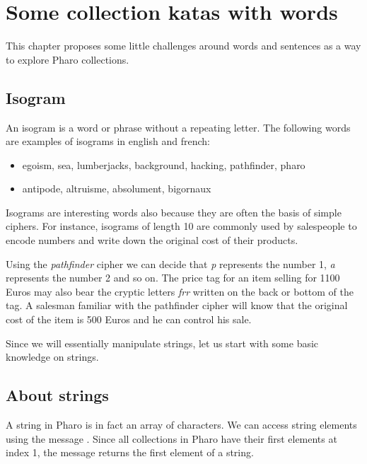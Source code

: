 \documentclass[10pt,twoside,english]{_support/latex/sbabook/sbabook}
\begin{document}
\frontmatter
\pagestyle{plain}

\tableofcontents*
\clearpage\listoffigures

\mainmatter

\chapter{Some collection katas with words}\label{cha:katas}
This chapter proposes some little challenges around words and sentences as a way to explore Pharo collections.
\section{Isogram}
An isogram is a word or phrase without a repeating letter. The following words are examples of isograms in english and french:

\begin{itemize}
\item egoism, sea, lumberjacks, background, hacking, pathfinder, pharo
\item antipode, altruisme, absolument, bigornaux
\end{itemize}

Isograms are interesting words also because they are often the basis of simple ciphers. For instance, isograms of length 10 are commonly used by salespeople to encode numbers and write down the original cost of their products.

Using the \textit{pathfinder} cipher we can decide that \textit{p} represents the number 1, \textit{a} represents the number 2 and so on. The price tag for an item selling for 1100 Euros may also bear the cryptic letters \textit{frr} written on the back or bottom of the tag. A salesman familiar with the pathfinder cipher will know that the original cost of the item is 500 Euros and he can control his sale. 

Since we will essentially manipulate strings, let us start with some basic knowledge on strings. 
\section{About strings}
A string in Pharo is in fact an array of characters. We can access string elements using the message . Since all collections in Pharo have their first elements at index 1, the message  returns the first element of a string. 

\end{document}
